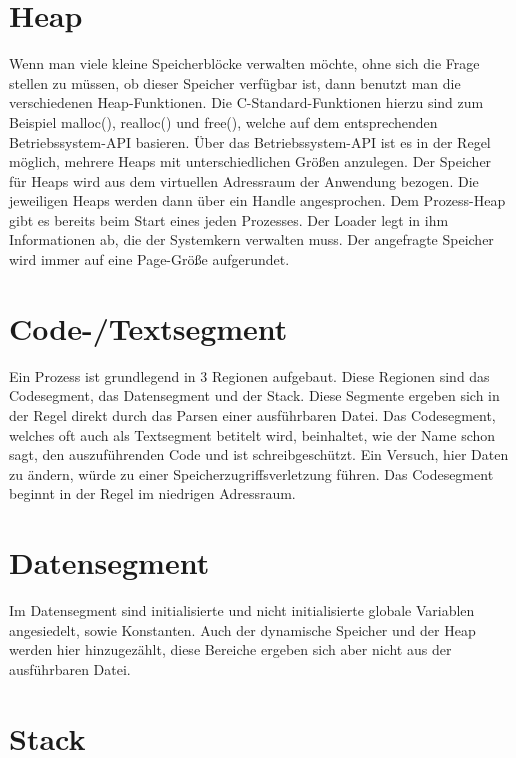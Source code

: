 \documentclass[12pt]{book}
\begin{document}
\section{Heap}

Wenn man viele kleine Speicherblöcke verwalten möchte, ohne sich die Frage
stellen zu müssen, ob dieser Speicher verfügbar ist, dann benutzt man die
verschiedenen Heap-Funktionen. Die C-Standard-Funktionen hierzu sind zum
Beispiel malloc(), realloc() und free(), welche auf dem entsprechenden
Betriebssystem-API basieren. Über das Betriebssystem-API ist es in der Regel
möglich, mehrere Heaps mit unterschiedlichen Größen anzulegen. Der Speicher für
Heaps wird aus dem virtuellen Adressraum der Anwendung bezogen. Die jeweiligen
Heaps werden dann über ein Handle angesprochen. Dem Prozess-Heap gibt es bereits
beim Start eines jeden Prozesses. Der Loader legt in ihm Informationen ab, die
der Systemkern verwalten muss. Der angefragte Speicher wird immer auf eine
Page-Größe aufgerundet.

\section{Code-/Textsegment}

Ein Prozess ist grundlegend in 3 Regionen aufgebaut. Diese Regionen sind das
Codesegment, das Datensegment und der Stack. Diese Segmente ergeben sich in der
Regel direkt durch das Parsen einer ausführbaren Datei. Das Codesegment, welches
oft auch als Textsegment betitelt wird, beinhaltet, wie der Name schon sagt, den
auszuführenden Code und ist schreibgeschützt. Ein Versuch, hier Daten zu ändern,
würde zu einer Speicherzugriffsverletzung führen. Das Codesegment beginnt in der
Regel im niedrigen Adressraum.


\section{Datensegment}

Im Datensegment sind initialisierte und nicht initialisierte globale Variablen
angesiedelt, sowie Konstanten. Auch der dynamische Speicher und der Heap werden
hier hinzugezählt, diese Bereiche ergeben sich aber nicht aus der ausführbaren
Datei.

\section{Stack}
\end{document}
